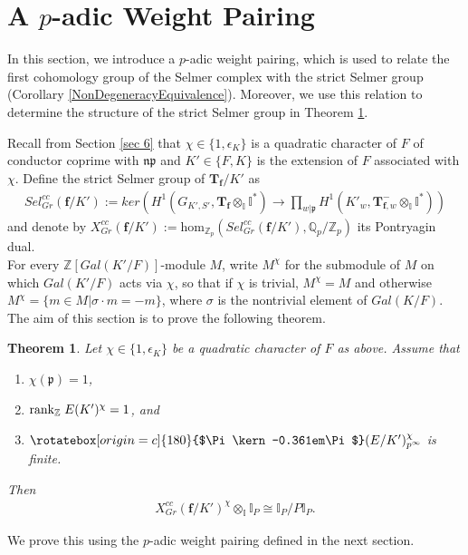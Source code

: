 \documentclass[reqno,10pt]{amsart}
\newcommand{\zp}{\mathbb{Z}_{p}}
\newcommand{\qp}{\mathbb{Q}_{p}}
\newcommand{\z}{\mathbb{Z}}
\newcommand{\I}{\mathbb{I}}
\newcommand{\f}{\mathbf{f}}
\newcommand{\T}{\mathbf{T}}
\newcommand{\p}{\mathfrak{p}}
\newcommand{\Varpi}{\rotatebox[origin=c]{180}{$\Pi\kern-0.361em\Pi$}}
\theoremstyle{plain}
\newtheorem{thm}{Theorem}[section]
\theoremstyle{definition}
\begin{document}
\section{A $p$-adic Weight Pairing} \label{p-adic weight pairing section}
In this section, we introduce a $p$-adic weight pairing, which is used to relate the first cohomology group of the Selmer complex with the strict Selmer group (Corollary \ref{NonDegeneracyEquivalence}). Moreover, we use this relation to determine the structure of the strict Selmer group in Theorem \ref{ineq4}.

Recall from Section \ref{sec 6} that $\chi \in \{1,\epsilon_K\}$ is a quadratic character of $F$ of conductor coprime with $\mathfrak{np}$ and $K' \in \{F,K\}$ is the extension of $F$ associated with $\chi$. Define the strict Selmer group of $\T_\f/K'$ as
\begin{align*}
    Sel^{cc}_{Gr}(\f/K') := ker \left(H^1(G_{K',S'},\T_\f \otimes_\I \I^*) \rightarrow \prod_{w|\mathfrak{p}} H^1(K'_w,\T_{\f,w}^- \otimes_\I \I^*) \right)
\end{align*}
and denote by $X^{cc}_{Gr}(\f/K') := \mathrm{hom}_{\zp}(Sel^{cc}_{Gr}(\f/K'),\qp/\zp)$ its Pontryagin dual.
\\
For every $\z[Gal(K'/F)]$-module $M$, write $M^\chi$ for the submodule of $M$ on which $Gal(K'/F)$ acts via $\chi$, so that if $\chi$ is trivial, $M^\chi = M$ and otherwise $M^\chi = \{m \in M | \sigma \cdot m = -m \}$, where $\sigma$ is the nontrivial element of $Gal(K/F)$. The aim of this section is to prove the following theorem.

\begin{thm} \label{ineq4}
 Let $\chi \in \{1, \epsilon_K\}$ be a quadratic character of $F$ as above. Assume that 
 \begin{enumerate}
     \item $\chi(\p) = 1$,
     \item $\mathrm{rank}_\z \hspace{0.01mm} \hspace{1mm} E(K')^\chi = 1$, and
     \item $\Varpi(E/K')^\chi_{p^\infty}$ is finite.
 \end{enumerate}
 Then
 \begin{align*}
     X^{cc}_{Gr}(\f/K')^\chi \otimes_\I \I_P \cong \I_P/P\I_P.
 \end{align*}
\end{thm}
We prove this using the $p$-adic weight pairing defined in the next section.
\end{document}
